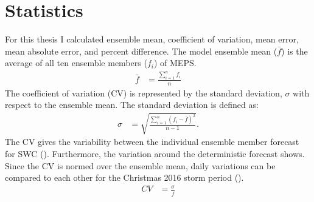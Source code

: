 \section{Statistics}
For this thesis I calculated ensemble mean, coefficient of variation, mean error, mean absolute error, and percent difference. 
\label{sec:ens_mean_spread}
The model ensemble mean ($\bar{f}$) is the average of all ten ensemble members ($f_i$) of MEPS.
\begin{align}
	\bar{f} & = \frac{\sum_{i=1}^n f_i}{n} \label{eq:meanMEPS}
\end{align}
The coefficient of variation (CV) is represented by the standard deviation, $\sigma$  with respect to the ensemble mean.
The standard deviation is defined as:
\begin{align}
	\sigma & = \sqrt{\frac{\sum_{i=1}^n (f_i - \bar{f})^2}{n-1}} .\label{eq:stdMEPS}
\end{align}
The CV gives the variability between the individual ensemble member forecast for SWC (). Furthermore, the variation around the deterministic forecast shows. Since the CV is normed over the ensemble mean, daily variations can be compared to each other for the Christmas 2016 storm period ().
\begin{align}
	CV & = \frac{\sigma}{\bar{f}}
\end{align}
%
